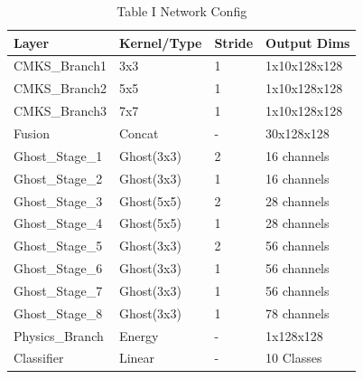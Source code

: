 \begin{table}
\caption{Table I Network Config}
\begin{tabular}{llll}
\toprule
Layer & Kernel/Type & Stride & Output Dims \\
\midrule
CMKS_Branch1 & 3x3 & 1 & 1x10x128x128 \\
CMKS_Branch2 & 5x5 & 1 & 1x10x128x128 \\
CMKS_Branch3 & 7x7 & 1 & 1x10x128x128 \\
Fusion & Concat & - & 30x128x128 \\
Ghost_Stage_1 & Ghost(3x3) & 2 & 16 channels \\
Ghost_Stage_2 & Ghost(3x3) & 1 & 16 channels \\
Ghost_Stage_3 & Ghost(5x5) & 2 & 28 channels \\
Ghost_Stage_4 & Ghost(5x5) & 1 & 28 channels \\
Ghost_Stage_5 & Ghost(3x3) & 2 & 56 channels \\
Ghost_Stage_6 & Ghost(3x3) & 1 & 56 channels \\
Ghost_Stage_7 & Ghost(3x3) & 1 & 56 channels \\
Ghost_Stage_8 & Ghost(3x3) & 1 & 78 channels \\
Physics_Branch & Energy & - & 1x128x128 \\
Classifier & Linear & - & 10 Classes \\
\bottomrule
\end{tabular}
\end{table}
